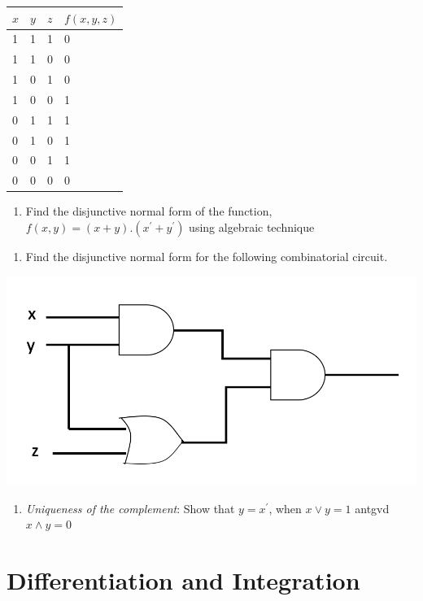 \documentclass[]{book}
\providecommand{\tightlist}{%
  \setlength{\itemsep}{0pt}\setlength{\parskip}{0pt}}
\begin{document}
\begin{longtable}[]{@{}llll@{}}
\toprule
\(x\) & \(y\) & \(z\) & \(f(x,y,z)\)\tabularnewline
\midrule
\endhead
1 & 1 & 1 & 0\tabularnewline
1 & 1 & 0 & 0\tabularnewline
1 & 0 & 1 & 0\tabularnewline
1 & 0 & 0 & 1\tabularnewline
0 & 1 & 1 & 1\tabularnewline
0 & 1 & 0 & 1\tabularnewline
0 & 0 & 1 & 1\tabularnewline
0 & 0 & 0 & 0\tabularnewline
\bottomrule
\end{longtable}

\begin{enumerate}
\def\labelenumi{\arabic{enumi}.}
\setcounter{enumi}{17}
\tightlist
\item
  Find the disjunctive normal form of the function, \(f(x,y)= (x+y).(x^\prime+y^\prime)\) using algebraic technique
\end{enumerate}

\begin{enumerate}
\def\labelenumi{\arabic{enumi}.}
\setcounter{enumi}{18}
\tightlist
\item
  Find the disjunctive normal form for the following combinatorial circuit.
\end{enumerate}

\begin{center}\includegraphics[width=0.8\linewidth]{figure/networkQ18} \end{center}

\begin{enumerate}
\def\labelenumi{\arabic{enumi}.}
\setcounter{enumi}{19}
\tightlist
\item
  \emph{Uniqueness of the complement}: Show that \(y=x^\prime\), when \(x \lor y=1\) antgvd \(x\land y = 0\)
\end{enumerate}

\hypertarget{differentiation-and-integration}{%
\chapter{Differentiation and Integration}\label{differentiation-and-integration}}
\end{document}
